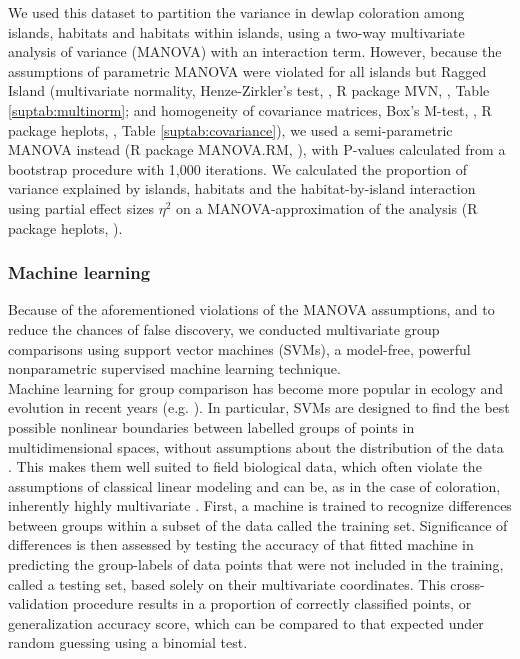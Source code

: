 We used this dataset to partition the variance in dewlap coloration among islands, habitats and habitats within islands, using a two-way multivariate analysis of variance (MANOVA) with an interaction term. However, because the assumptions of parametric MANOVA were violated for all islands but Ragged Island (multivariate normality, Henze-Zirkler's test, \citealt{Henze1990}, R package MVN, \citealt{Korkmaz2014}, Table \ref{suptab:multinorm}; and homogeneity of covariance matrices, Box's M-test, \citealt{Box1949, Morrison1988}, R package heplots, \citealt{Fox2018}, Table \ref{suptab:covariance}), we used a semi-parametric MANOVA instead (R package MANOVA.RM, \citealt{Friedrich2018}), with P-values calculated from a bootstrap procedure with 1,000 iterations. We calculated the proportion of variance explained by islands, habitats and the habitat-by-island interaction using partial effect sizes $\eta^2$ on a MANOVA-approximation of the analysis (R package heplots, \citealt{Fox2018}).

\subsubsection*{Machine learning}


Because of the aforementioned violations of the MANOVA assumptions, and to reduce the chances of false discovery, we conducted multivariate group comparisons using support vector machines (SVMs), a model-free, powerful nonparametric supervised machine learning technique.\\


Machine learning for group comparison has become more popular in ecology and evolution in recent years (e.g. \citealt{Pigot2020}). In particular, SVMs are designed to find the best possible nonlinear boundaries between labelled groups of points in multidimensional spaces, without assumptions about the distribution of the data \citep{Cortes1995, Cristianini2000, Kim2018}. This makes them well suited to field biological data, which often violate the assumptions of classical linear modeling \citep{Kim2018} and can be, as in the case of coloration, inherently highly multivariate \citep{Cuthill1999}. First, a machine is trained to recognize differences between groups within a subset of the data called the training set. Significance of differences is then assessed by testing the accuracy of that fitted machine in predicting the group-labels of data points that were not included in the training, called a testing set, based solely on their multivariate coordinates. This cross-validation procedure results in a proportion of correctly classified points, or generalization accuracy score, which can be compared to that expected under random guessing using a binomial test.\\

